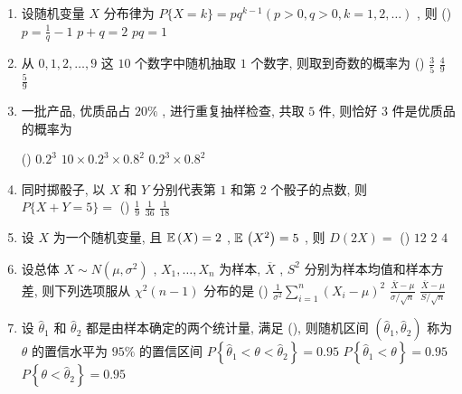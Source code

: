\begin{enumerate}
	\item 设随机变量 $X$ 分布律为 $P\{ X=k \}=pq^{k-1}(p>0,q>0,k=1,2,\ldots)$ , 则 (\hspace{1pc})
	{$p=\frac{1}{q}-1$}
	{$p+q=2$}
	{$pq=1$}

	\item 从 $0,1,2,\ldots,9$ 这 $10$ 个数字中随机抽取 $1$ 个数字, 则取到奇数的概率为 (\hspace{1pc})
	{$\frac{3}{5}$}
	{$\frac{4}{9}$}
	{$\frac{5}{9}$}

	\item 一批产品, 优质品占 $20\%$ , 进行重复抽样检查, 共取 $5$ 件, 则恰好 $3$ 件是优质品的概率为 
	
	(\hspace{1pc})
	{$0.2^3$}
	{$10\times 0.2^3\times 0.8^2$}
	{$0.2^3\times 0.8^2$}

	\item 同时掷骰子, 以 $X$ 和 $Y$ 分别代表第 $1$ 和第 $2$ 个骰子的点数, 则 $P\{ X+Y=5 \}=$ (\hspace{1pc})
	{$\frac{1}{9}$}
	{$\frac{1}{36}$}
	{$\frac{1}{18}$}

	\item 设 $X$ 为一个随机变量, 且 $\mathbb{E}\,(X)=2$ , $\mathbb{E}\,\left( X^2 \right)=5$ , 则 $D(2X)=$ (\hspace{1pc})
	{$12$}
	{$2$}
	{$4$}

	\item 设总体 $X\sim N\left( \mu,\sigma^2 \right)$ , $X_1,\ldots,X_n$ 为样本, $\overline{X}$ , $S^2$ 分别为样本均值和样本方差, 则下列选项服从 $\chi^2(n-1)$ 分布的是 (\hspace{1pc})
	{$\frac{1}{\sigma^2}\sum_{i=1}^n \left(X_i-\mu\right)^2$}
	{$\frac{\overline{X}-\mu}{\sigma/\sqrt{n}}$}
	{$\frac{\overline{X}-\mu}{S/\sqrt{n}}$}

	\item 设 $\hat{\theta}_1$ 和 $\hat{\theta}_2$ 都是由样本确定的两个统计量, 满足 (\hspace{1pc}), 则随机区间 $\left(\hat{\theta}_1,\hat{\theta}_2\right)$ 称为 $\theta$ 的置信水平为 $95\%$ 的置信区间
	{$P\left\{ \hat{\theta}_1<\theta<\hat{\theta}_2 \right\}=0.95$}
	{$P\left\{ \hat{\theta}_1<\theta \right\}=0.95$}
	{$P\left\{ \theta<\hat{\theta}_2 \right\}=0.95$}
\end{enumerate}

